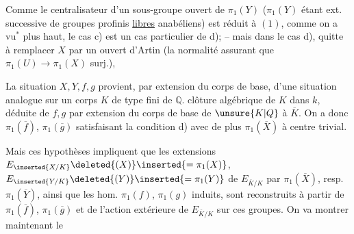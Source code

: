
Comme le centralisateur d'un sous-groupe ouvert de $\pi_1(Y)$ ($\pi_1(Y)$ étant ext. successive de groupes profinis \uline{libres} anabéliens) est réduit à $(1)$, comme on a vu${}^*$ plus haut, le cas c) est un cas particulier de d);   -- mais dans le cas d), quitte à remplacer $X$ par un ouvert d'Artin (la normalité assurant que $\pi_1(U)\longrightarrow\pi_1(X)$ surj.),



La situation $X,Y,f,g$ provient, par extension du corps de base, d'une situation analogue sur un corps $K$  de type fini de $\mathbb Q$.   clôture algébrique  de $K$ dans $k$,   déduite de  $f,g$ par extension du corps de base de $\unsure{K|Q}$ à $\overline K$. On a donc $\pi_1(\overline f)$, $\pi_1(\overline g)$ satisfaisant la condition d) avec de plus $\pi_1(\overline X)$ à centre trivial.

Mais ces hypothèses impliquent que les extensions $E_{\inserted{X/K}}\deleted{(X)}\inserted{=\pi_1(X)}$, $E_{\inserted{Y/K}}\deleted{(Y)}\inserted{=\pi_1(Y)}$ de $E_{\overline K/K}$ par $\pi_1(\overline X)$, resp. $\pi_1(\overline Y)$, ainsi que les hom. $\pi_1(f)$, $\pi_1(g)$ induits, sont reconstruits à partir de  $\pi_1(\overline f)$, $\pi_1(\overline g)$ et de l'action extérieure de $E_{\overline K/K}$ sur ces groupes. On va montrer maintenant le

